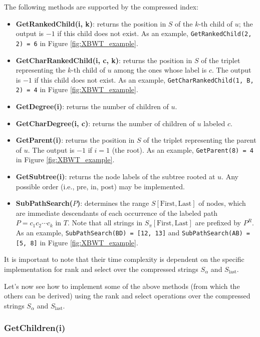 The following methods are supported by the compressed index:
\begin{itemize}
    \item \textbf{GetRankedChild(i, k)}: returns the position in $S$ of the $k$-th child of $u$; the output is $-1$ if this child does not exist. As an example, \texttt{GetRankedChild(2, 2) = 6} in Figure \ref{fig:XBWT_example}.
    \item \textbf{GetCharRankedChild(i, c, k)}: returns the position in $S$ of the triplet representing the $k$-th child of $u$ among the ones whose label is $c$. The output is $-1$ if this child does not exist. As an example, \texttt{GetCharRankedChild(1, B, 2) = 4} in Figure \ref{fig:XBWT_example}.
    \item \textbf{GetDegree(i)}: returns the number of children of $u$.
    \item \textbf{GetCharDegree(i, c)}: returns the number of children of $u$ labeled $c$.
    \item \textbf{GetParent(i)}: returns the position in $S$ of the triplet representing the parent of $u$. The output is $-1$ if $i = 1$ (the root). As an example, \texttt{GetParent(8) = 4} in Figure \ref{fig:XBWT_example}.
    \item \textbf{GetSubtree(i)}: returns the node labels of the subtree rooted at $u$. Any possible order (i.e., pre, in, post) may be implemented.
    \item \textbf{SubPathSearch($P$)}: determines the range $S[\text{First}, \text{Last}]$ of nodes, which are immediate descendants of each occurrence of the labeled path $P = c_1c_2 \cdots c_k$ in $T$. Note that all strings in $S_{\pi}[\text{First}, \text{Last}]$ are prefixed by $P^R$. As an example, \texttt{SubPathSearch(BD) = [12, 13]} and \texttt{SubPathSearch(AB) = [5, 8]} in Figure \ref{fig:XBWT_example}.
\end{itemize}

It is important to note that their time complexity is dependent on the specific implementation for rank and select over the compressed strings $S_{\alpha}$ and $S_{\text{last}}$. 

Let's now see how to implement some of the above methods (from which the others can be derived) using the rank and select operations over the compressed strings $S_{\alpha}$ and $S_{\text{last}}$.

\subsubsection*{GetChildren(i)}


